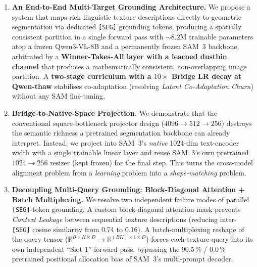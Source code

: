 \documentclass{article}
\begin{document}
\begin{enumerate}
    \item \textbf{An End-to-End Multi-Target Grounding Architecture.} We propose a system that maps rich linguistic texture descriptions directly to geometric segmentation via dedicated \texttt{[SEG]} grounding tokens, producing a spatially consistent partition in a single forward pass with ${\sim}8.2$M trainable parameters atop a frozen Qwen3-VL-8B and a permanently frozen SAM~3 backbone, arbitrated by a \textbf{Winner-Takes-All layer with a learned dustbin channel} that produces a mathematically consistent, non-overlapping image partition. A \textbf{two-stage curriculum with a $10\times$ Bridge LR decay at Qwen-thaw} stabilises co-adaptation (resolving \emph{Latent Co-Adaptation Churn}) without any SAM fine-tuning.

    \item \textbf{Bridge-to-Native-Space Projection.} We demonstrate that the conventional square-bottleneck projector design ($4096 \to 512 \to 256$) destroys the semantic richness a pretrained segmentation backbone can already interpret. Instead, we project into SAM~3's \emph{native} 1024-dim text-encoder width with a single trainable linear layer and reuse SAM~3's own pretrained $1024 \to 256$ resizer (kept frozen) for the final step. This turns the cross-model alignment problem from a \emph{learning} problem into a \emph{shape-matching} problem.

    \item \textbf{Decoupling Multi-Query Grounding: Block-Diagonal Attention + Batch Multiplexing.} We resolve two independent failure modes of parallel \texttt{[SEG]}-token grounding. A custom block-diagonal attention mask prevents \emph{Context Leakage} between sequential texture descriptions (reducing inter-\texttt{[SEG]} cosine similarity from 0.74 to 0.16). A batch-multiplexing reshape of the query tensor ($\mathbb{R}^{B \times K \times D} \to \mathbb{R}^{(BK) \times 1 \times D}$) forces each texture query into its own independent ``Slot 1'' forward pass, bypassing the 90.5\,\% / 0.0\,\% pretrained positional allocation bias of SAM~3's multi-prompt decoder.


\end{enumerate}
\end{document}
